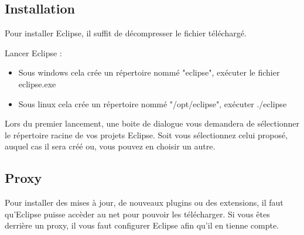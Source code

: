 \medskip

\subsection{Installation}
Pour installer Eclipse, il suffit de décompresser le fichier téléchargé. 

\bigskip

\noindent
Lancer Eclipse :
\begin{itemize}
\item Sous windows cela crée un répertoire nommé "eclipse", exécuter le fichier eclipse.exe
\item Sous linux cela crée un répertoire nommé "/opt/eclipse", exécuter ./eclipse
\end{itemize}

\noindent
Lors du premier lancement, une boite de dialogue vous demandera de sélectionner le répertoire racine de vos projets Eclipse. Soit vous sélectionnez celui proposé, auquel cas il sera créé ou, vous pouvez en choisir un autre.

\newpage


\subsection{Proxy}

Pour installer des mises à jour, de nouveaux plugins ou des extensions, il faut qu'Eclipse puisse accèder au net pour pouvoir les télécharger.  Si vous êtes derrière un proxy, il vous faut configurer Eclipse afin qu'il en tienne compte.

\bigskip

